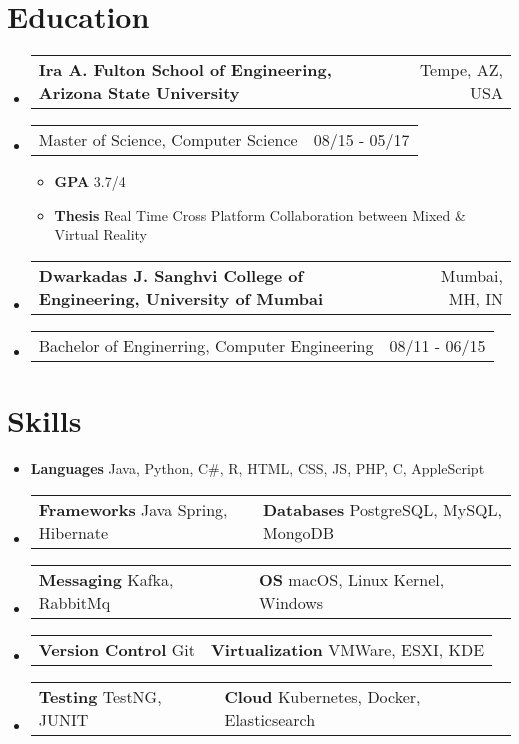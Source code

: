 \documentclass[a4paper,12pt]{article} %
\makeatletter
\newcommand\tableVerticalSpace{-1em}
\newcommand\tableItemVerticalSpace{-1em}
\newcommand\zeroSpacing{0em}
\newcommand\sectionSpacing{0.5em}
\newcommand{\fourElementListStart}{\begin{itemize}[label={},leftmargin=*]\setlength\itemsep{0.3em}}
\newcommand{\fourElementListEnd}{\end{itemize}\vspace{\zeroSpacing}}
\newcommand{\generalListStart}{\vspace{\zeroSpacing}\begin{itemize}[leftmargin=2em]\setlength\itemsep{-0.4em}}
\newcommand{\generalListEnd}{\end{itemize}\vspace{\zeroSpacing}}
\newcommand{\generalSubListStart}{\vspace{-1em}\begin{itemize}[leftmargin=2em]\setlength\itemsep{-0.2em}}
\newcommand{\generalSubListEnd}{\end{itemize}\vspace{\zeroSpacing}}
\newcommand{\institutionItem}[2]{
	\vspace{\tableItemVerticalSpace}\item
		\begin{tabular*}{\textwidth}{@{}l@{\extracolsep{\fill}}r@{}}
			\textbf{#1} & {\small{#2}} \\[\zeroSpacing]
		\end{tabular*}\vspace{\tableVerticalSpace}
}
\newcommand{\twoElementItem}[2]{
	\vspace{\tableItemVerticalSpace}\item
		\begin{tabular*}{\textwidth}{@{}l@{\extracolsep{\fill}}r@{}}
			{#1} & {\small{#2}} \\[\zeroSpacing]
		\end{tabular*}\vspace{\tableVerticalSpace}
}
\newcommand{\twoKeyValuePairElementItem}[4]{
	\vspace{\tableItemVerticalSpace}\item
		\begin{tabular}{@{}p{7cm}p{11cm}}

			\vspace{0.5em}\textbf{#1}{ #2} & \vspace{0.5em}\textbf{#3}{ #4}

		\end{tabular}\vspace{\tableVerticalSpace}
}
\newcommand{\oneKeyValuePairElement}[2]{
	\item \textbf{#1}{ #2}
}
\makeatother
\begin{document}
\vspace{\sectionSpacing}\section*{Education}

\fourElementListStart
	\institutionItem {Ira A. Fulton School of Engineering, Arizona State University}{Tempe, AZ, USA}
	\twoElementItem {Master of Science, Computer Science}{08/15 - 05/17}
	\generalSubListStart
		\item \textbf{GPA} 3.7/4
		\item \textbf{Thesis} Real Time Cross Platform Collaboration between Mixed \& Virtual Reality
	\generalSubListEnd
	\institutionItem {Dwarkadas J. Sanghvi College of Engineering, University of Mumbai}{Mumbai, MH, IN}
	\twoElementItem {Bachelor of Enginerring, Computer Engineering}{08/11 - 06/15}
\fourElementListEnd


\vspace{0.8em}\section*{Skills}

\generalListStart
	\vspace{-0.5em}\oneKeyValuePairElement{Languages}{Java, Python, C\#, R, HTML, CSS, JS, PHP, C, AppleScript}
	\twoKeyValuePairElementItem{Frameworks}{Java Spring, Hibernate}{Databases}{PostgreSQL, MySQL, MongoDB}
	\vspace{-0.5em}\twoKeyValuePairElementItem{Messaging}{Kafka, RabbitMq}{OS}{macOS, Linux Kernel, Windows}
	\vspace{-0.5em}\twoKeyValuePairElementItem{Version Control}{Git}{Virtualization}{VMWare, ESXI, KDE}
	\vspace{-0.5em}\twoKeyValuePairElementItem{Testing} {TestNG, JUNIT}{Cloud}{Kubernetes, Docker, Elasticsearch}\vspace{-1em}
\generalListEnd

\end{document}
